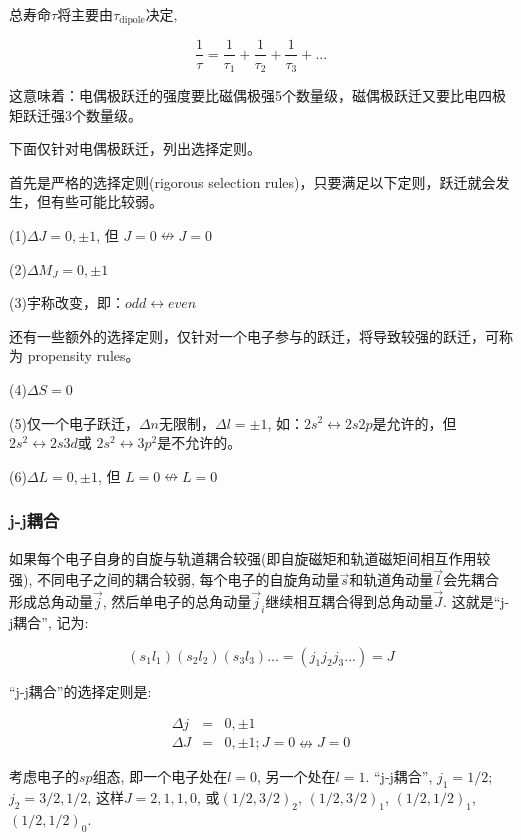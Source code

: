 总寿命$\tau$将主要由$\tau_{\text{dipole}}$决定,

\begin{equation*}
\frac{1}{\tau} = \frac{1}{\tau_1} + \frac{1}{\tau_2} +
\frac{1}{\tau_3} +...
\end{equation*}


这意味着：电偶极跃迁的强度要比磁偶极强5个数量级，磁偶极跃迁又要比电四极矩跃迁强3个数量级。

下面仅针对电偶极跃迁，列出选择定则。

首先是严格的选择定则(rigorous selection
rules)，只要满足以下定则，跃迁就会发生，但有些可能比较弱。

(1)$\Delta J = 0, \pm 1$, 但 $J=0 \nleftrightarrow J=0$

(2)$\Delta M_J = 0, \pm 1$

(3)宇称改变，即：$odd \leftrightarrow even$

还有一些额外的选择定则，仅针对一个电子参与的跃迁，将导致较强的跃迁，可称为
propensity rules。

(4)$\Delta S =0$

(5)仅一个电子跃迁，$\Delta n $无限制，$\Delta l =\pm 1$, 如：$2s^2
\leftrightarrow 2s2p$是允许的，但$2s^2 \leftrightarrow 2s3d$或 $2s^2
\leftrightarrow 3p^2$是不允许的。

(6)$\Delta L =0, \pm 1$, 但 $L =0 \nleftrightarrow L=0$


\subsubsection{j-j耦合}

如果每个电子自身的自旋与轨道耦合较强(即自旋磁矩和轨道磁矩间相互作用较强),
不同电子之间的耦合较弱, 每个电子的自旋角动量$\vec
s$和轨道角动量$\vec l$会先耦合形成总角动量$\vec j$,
然后单电子的总角动量$\vec j_i$继续相互耦合得到总角动量$\vec J$.
这就是``j-j耦合'', 记为:

\begin{equation*}
(s_1 l_1)(s_2 l_2)(s_3 l_3)... =(j_1 j_2 j_3 ...) =J
\end{equation*}

``j-j耦合''的选择定则是:

\begin{eqnarray*}
  \Delta j &=& 0, \pm 1 \\
  \Delta J &=& 0, \pm 1; J=0 \nleftrightarrow J=0
\end{eqnarray*}



考虑电子的$sp$组态, 即一个电子处在$l=0$, 另一个处在$l=1$.
``j-j耦合'', $j_1 =1/2$; $j_2 = 3/2, 1/2$, 这样$J = 2, 1, 1, 0$,
或$(1/2, 3/2)_2$, $(1/2, 3/2)_1$, $(1/2, 1/2)_1$, $(1/2, 1/2)_0$.





